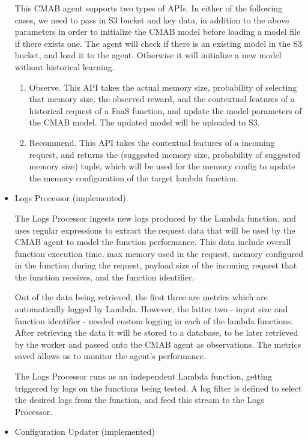 \documentclass[conference]{IEEEtran}
\begin{document}
\begin{itemize}
This CMAB agent supports two types of APIs. In either of the following cases, we need to pass in S3 bucket and key data, in addition to the above parameters in order to initialize the CMAB model before loading a model file if there exists one. The agent will check if there is an existing model in the S3 bucket, and load it to the agent. Otherwise it will initialize a new model without historical learning.
\begin{enumerate}
    \item Observe. This API takes the actual memory size, probability of selecting that memory size, the observed reward, and the contextual features of a historical request of a FaaS function, and update the model parameters of the CMAB model. The updated model will be uploaded to S3.
    \item Recommend. This API takes the contextual features of a incoming request, and returns the (suggested memory size, probability of suggested memory size) tuple, which will be used for the memory config to update the memory configuration of the target lambda function.
\end{enumerate}

\item Logs Processor (implemented).

The Logs Processor ingests new logs produced by the Lambda function, and uses regular expressions to extract the request data that will be used by the CMAB agent to model the function performance. This data include overall function execution time, max memory used in the request, memory configured in the function during the request, payload size of the incoming request that the function receives, and the function identifier.

Out of the data being retrieved, the first three are metrics which are automatically logged by Lambda. However, the latter two - input size and function identifier - needed custom logging in each of the lambda functions. After retrieving the data it will be stored to a database, to be later retrieved by the worker and passed onto the CMAB agent as observations. The metrics saved allows us to monitor the agent's performance.

The Logs Processor runs as an independent Lambda function, getting triggered by logs on the functions being tested. A log filter is defined to select the desired logs from the function, and feed this stream to the Logs Processor.

\item Configuration Updater (implemented)


\end{itemize}
\end{document}
